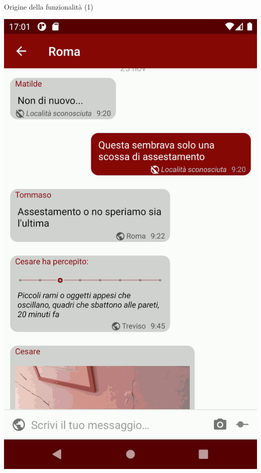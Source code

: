 \documentclass[compress]{beamer}
\begin{document}
\begin{frame}[c]{Origine della funzionalità (1)}
\begin{center}
\includegraphics[scale=0.3]{assets/02/chat.png}
\end{center}
\end{frame}
\end{document}
